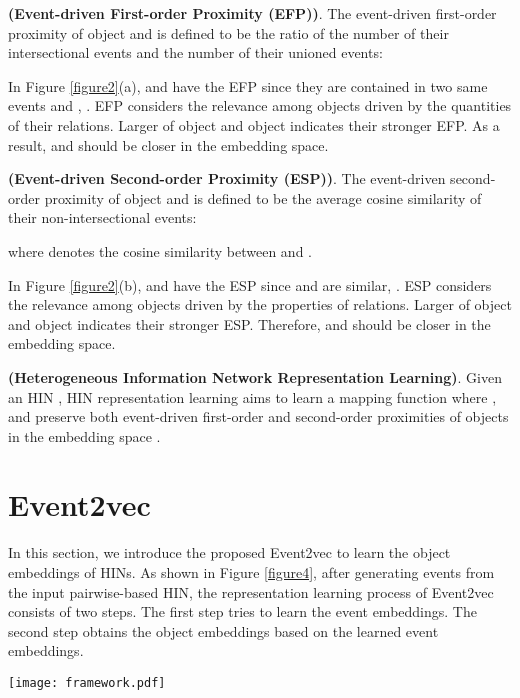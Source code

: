 \begin{mydef}
	\textbf{(Event-driven First-order Proximity (EFP))}. The event-driven first-order proximity of object  and  is defined to be the ratio of the number of their intersectional events and the number of their unioned events: 
	
\end{mydef}

In Figure \ref{figure2}(a),  and  have the EFP since they are contained in two same events  and , . EFP considers the relevance among objects driven by the quantities of their relations. Larger  of object  and object  indicates their stronger EFP. As a result,  and  should be closer in the embedding space.

\begin{mydef}
	\textbf{(Event-driven Second-order Proximity (ESP))}. The event-driven second-order proximity of object  and  is defined to be the average cosine similarity of their non-intersectional events:
	
	\noindent where  denotes the cosine similarity between  and .
\end{mydef}

In Figure \ref{figure2}(b),  and  have the ESP since  and  are similar, . ESP considers the relevance among objects driven by the properties of relations. Larger  of object  and object  indicates their stronger ESP. Therefore,  and  should be closer in the embedding space.

\begin{mydef}
	\textbf{(Heterogeneous Information Network Representation Learning)}. Given an HIN , HIN representation learning aims to learn a mapping function  where , and preserve both event-driven first-order and second-order proximities of objects in the embedding space .
\end{mydef}

\section{Event2vec}
In this section, we introduce the proposed Event2vec to learn the object embeddings of HINs. As shown in Figure \ref{figure4}, after generating events from the input pairwise-based HIN, the representation learning process of Event2vec consists of two steps. The first step tries to learn the event embeddings. The second step obtains the object embeddings based on the learned event embeddings.

\begin{figure*}
	\centering
	\texttt{[image: framework.pdf]}
	\caption{{\small The framework of Event2vec.}}\label{figure4}
\end{figure*}

